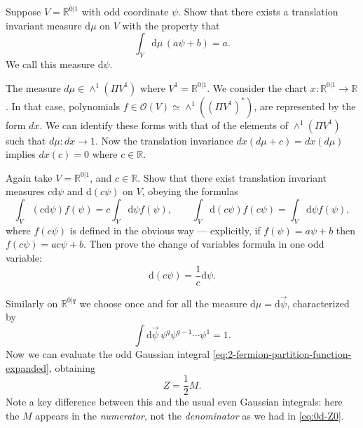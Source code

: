 \documentclass[12pt,letterpaper,reqno]{article}
\numberwithin{equation}{section}
\newcommand{\cO}{\ensuremath{\mathcal O}}
\newcommand{\R}{\ensuremath{\mathbb R}}
\newcommand{\half}{\ensuremath{\frac{1}{2}}}
\newcommand{\de}{\mathrm{d}}
\newcommand{\ti}[1]{\textit{#1}}
\begin{document}
\begin{exercise} Suppose $V = \R^{0 \vert 1}$ with odd coordinate $\psi$.
Show that there exists a translation invariant measure $\de \mu$ on $V$ with the property that
\begin{equation}
\int_V \de \mu \, (a \psi + b) = a.
\end{equation}
We call this measure $\de \psi$.
\end{exercise}

\begin{solution}
  The measure $d\mu\in \wedge^1(\Pi V^1)$ where $V^1=\R^{0|1}$.  We consider the chart $x:\R^{0|1}\to\R$.  In that case, polynomials $f\in\cO(V) \simeq \wedge^1((\Pi V^1)^*)$, are represented by the form $dx$.  We can identify these forms with that of the elements of $\wedge^1(\Pi V^1)$ such that $d\mu:dx\to 1$.  Now the translation invariance $dx(d\mu+c)=dx(d\mu)$ implies $dx(c)=0$ where $c\in\R$.
\end{solution}

\begin{exercise} Again take $V = \R^{0 \vert 1}$, and $c \in \R$.
Show that there exist translation invariant measures $c \de \psi$ and $\de (c \psi)$
on $V$, obeying the formulas
\begin{equation}
  \int_V (c \de \psi) f(\psi) = c \int_V \de \psi f(\psi), \qquad \int_V \de(c \psi) f(c \psi) = \int_V \de \psi f(\psi),
\end{equation}
where $f(c \psi)$ is defined in the obvious way --- explicitly,
if $f(\psi) = a \psi + b$ then $f(c \psi) = a c \psi + b$.
Then prove the change of variables formula in one odd variable:
\begin{equation}
  \de (c \psi) = \frac{1}{c} \de \psi.
\end{equation}
\end{exercise}

\begin{solution}
  
\end{solution}


Similarly on $\R^{0 \vert q}$ we choose once and for all the 
measure $\de \mu = \de \vec\psi$, characterized by
\begin{equation}
  \int \de \vec\psi \, \psi^q \psi^{q-1} \cdots \psi^1 = 1.
\end{equation}
Now we can evaluate the odd Gaussian integral \eqref{eq:2-fermion-partition-function-expanded}, obtaining
\begin{equation} \label{eq:2d-odd-gaussian}
 Z = \half M.  
\end{equation}
Note a key difference between this and the usual even Gaussian integrals:
here the $M$ appears in the \ti{numerator}, not the \ti{denominator}
as we had in \eqref{eq:0d-Z0}.
\end{document}

